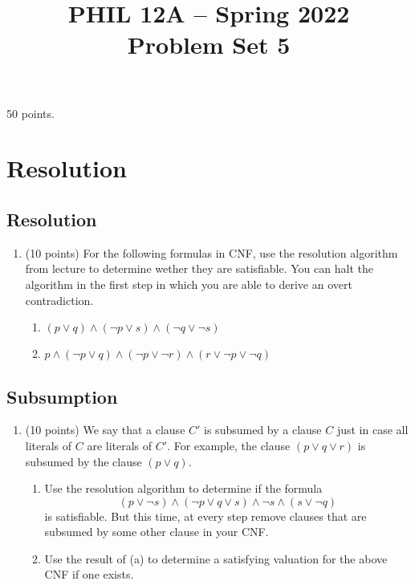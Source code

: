 \documentclass[english]{article}
\theoremstyle{definition}
\begin{document}
 

 \title{PHIL 12A -- Spring 2022 \\ Problem Set 5}
\date{}

\maketitle


\begin{center}50 points.\end{center}

\setcounter{section}{0}

\section{Resolution}

\subsection{Resolution}

\begin{enumerate}[label=\arabic*.,ref=\arabic*,resume]
\item (10 points) For the following formulas in CNF, use the resolution algorithm from lecture to determine wether they are satisfiable. You can halt the algorithm in the first step in which you are able to derive an overt contradiction. 
\begin{enumerate}
\item $(p \lor q) \land (\neg p \lor s) \land (\neg q \lor \neg s) $
\item $p \land (\neg p \lor q) \land (\neg p \lor \neg r) \land (r \lor \neg p \lor \neg q)$
\end{enumerate}
\end{enumerate}

\subsection{Subsumption}

\begin{enumerate}[label=\arabic*.,ref=\arabic*,resume]
\item (10 points) We say that a clause $C'$ is subsumed by a clause $C$  just in case all literals of $C$ are literals of $C'$.  For example, the clause $(p\vee q\vee r)$ is subsumed by the clause $(p\vee q)$.
\begin{enumerate}
\item Use the resolution algorithm to determine if the formula
\[ 
(p \lor \neg s) \land (\neg p \lor q \lor s) \land \neg s \land (s \lor \neg q) 
\]
is satisfiable. But this time, at every step remove clauses that are subsumed by some other clause in your CNF. 
\item Use the result of (a) to determine a satisfying valuation for the above CNF if one exists. 
\end{enumerate} 
\end{enumerate}
\end{document}
